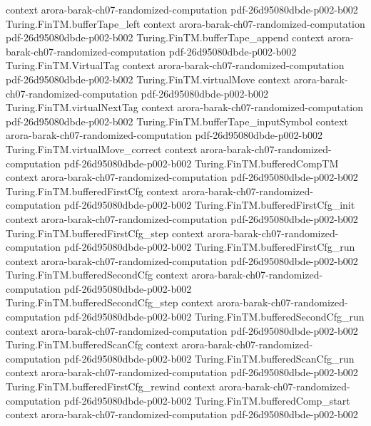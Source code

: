 \begin{theorem}
  {context}
  {arora-barak-ch07-randomized-computation}
  {pdf-26d95080dbde-p002-b002}
\proofstep
  {Turing.FinTM.bufferTape_left}
  {context}
  {arora-barak-ch07-randomized-computation}
  {pdf-26d95080dbde-p002-b002}
\proofstep
  {Turing.FinTM.bufferTape_append}
  {context}
  {arora-barak-ch07-randomized-computation}
  {pdf-26d95080dbde-p002-b002}
\proofstep
  {Turing.FinTM.VirtualTag}
  {context}
  {arora-barak-ch07-randomized-computation}
  {pdf-26d95080dbde-p002-b002}
\proofstep
  {Turing.FinTM.virtualMove}
  {context}
  {arora-barak-ch07-randomized-computation}
  {pdf-26d95080dbde-p002-b002}
\proofstep
  {Turing.FinTM.virtualNextTag}
  {context}
  {arora-barak-ch07-randomized-computation}
  {pdf-26d95080dbde-p002-b002}
\proofstep
  {Turing.FinTM.bufferTape_inputSymbol}
  {context}
  {arora-barak-ch07-randomized-computation}
  {pdf-26d95080dbde-p002-b002}
\proofstep
  {Turing.FinTM.virtualMove_correct}
  {context}
  {arora-barak-ch07-randomized-computation}
  {pdf-26d95080dbde-p002-b002}
\proofstep
  {Turing.FinTM.bufferedCompTM}
  {context}
  {arora-barak-ch07-randomized-computation}
  {pdf-26d95080dbde-p002-b002}
\proofstep
  {Turing.FinTM.bufferedFirstCfg}
  {context}
  {arora-barak-ch07-randomized-computation}
  {pdf-26d95080dbde-p002-b002}
\proofstep
  {Turing.FinTM.bufferedFirstCfg_init}
  {context}
  {arora-barak-ch07-randomized-computation}
  {pdf-26d95080dbde-p002-b002}
\proofstep
  {Turing.FinTM.bufferedFirstCfg_step}
  {context}
  {arora-barak-ch07-randomized-computation}
  {pdf-26d95080dbde-p002-b002}
\proofstep
  {Turing.FinTM.bufferedFirstCfg_run}
  {context}
  {arora-barak-ch07-randomized-computation}
  {pdf-26d95080dbde-p002-b002}
\proofstep
  {Turing.FinTM.bufferedSecondCfg}
  {context}
  {arora-barak-ch07-randomized-computation}
  {pdf-26d95080dbde-p002-b002}
\proofstep
  {Turing.FinTM.bufferedSecondCfg_step}
  {context}
  {arora-barak-ch07-randomized-computation}
  {pdf-26d95080dbde-p002-b002}
\proofstep
  {Turing.FinTM.bufferedSecondCfg_run}
  {context}
  {arora-barak-ch07-randomized-computation}
  {pdf-26d95080dbde-p002-b002}
\proofstep
  {Turing.FinTM.bufferedScanCfg}
  {context}
  {arora-barak-ch07-randomized-computation}
  {pdf-26d95080dbde-p002-b002}
\proofstep
  {Turing.FinTM.bufferedScanCfg_run}
  {context}
  {arora-barak-ch07-randomized-computation}
  {pdf-26d95080dbde-p002-b002}
\proofstep
  {Turing.FinTM.bufferedFirstCfg_rewind}
  {context}
  {arora-barak-ch07-randomized-computation}
  {pdf-26d95080dbde-p002-b002}
\proofstep
  {Turing.FinTM.bufferedComp_start}
  {context}
  {arora-barak-ch07-randomized-computation}
  {pdf-26d95080dbde-p002-b002}

\end{theorem}
